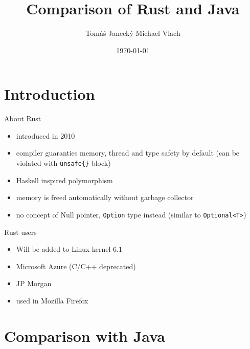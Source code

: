 \documentclass[10pt]{beamer}
\title[Barclays]{Comparison of Rust and Java}
\author[Tomáš Janecký Michael Vlach]{Tomáš Janecký Michael Vlach}
\institute[Barclays]{BARX FX}
\date[\textcolor{white}{\today} ]
{\today}
\begin{document}
\frame{\titlepage}


\section{Introduction}
    \begin{frame}{About Rust}
	    \begin{itemize}
	        \item introduced in 2010
	        \item compiler guaranties memory, thread and type safety by default (can be violated with \texttt{unsafe\{\}} block)
	        \item Haskell inspired polymorphism
	        \item memory is freed automatically without garbage collector 
	        \item no concept of Null pointer, \texttt{Option} type instead (similar to \texttt{Optional<T>})
	    \end{itemize}
	    
	
    \end{frame}
    \begin{frame}{Rust users}
    \begin{itemize}
        \item Will be added to Linux kernel $6.1$
	    \item Microsoft Azure (C/C++ deprecated)
	    \item JP Morgan
	    \item used in Mozilla Firefox
	 \end{itemize}
    \end{frame}

\section{Comparison with Java}
\end{document}
